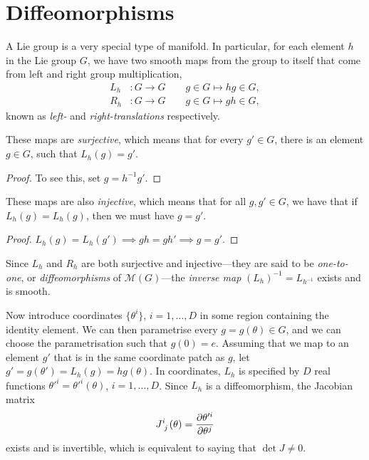 \section{Diffeomorphisms}%
\label{sec:diffeomorphisms}

A Lie group is a very special type of manifold. In particular, for each element $h$ in the Lie group $G$, we have two smooth maps from the group to itself that come from left and right group multiplication,
\begin{align}
  L_h &\colon G \to G \qquad g \in G \mapsto hg \in G, \\
  R_h &\colon G \to G \qquad g \in G \mapsto gh \in G,
\end{align}
known as \emph{left-} and \emph{right-translations} respectively.

\begin{claim}
  These maps are \emph{surjective}, which means that for every $g' \in G$, there is an element $g \in G$, such that $L_h(g) = g'$. 
\end{claim}
\begin{proof}
  To see this, set $g = h^{-1} g'$.
\end{proof}

\begin{claim}
  These maps are also \emph{injective}, which means that for all $g, g' \in G$, we have that if $L_h(g) = L_h(g)$, then we must have $g = g'$.
\end{claim}
\begin{proof}
  \(
    L_h(g) = L_h(g') \implies gh = gh' \implies g = g'.
    \)
\end{proof}
\begin{definition}[]
  Since $L_h$ and $R_h$ are both surjective and injective---they are said to be \emph{one-to-one}, or \emph{diffeomorphisms} of $\mathcal{M}(G)$---the \emph{inverse map} $(L_h)^{-1} = L_{h^{-1}}$ exists and is smooth.
\end{definition}

\begin{wrapfigure}{L}{0.37\columnwidth}
  \centering
  \def\svgwidth{0.3\columnwidth}
  
  \label{fig:l8f1}
\end{wrapfigure}

Now introduce coordinates $\{ \theta^i \}$, $i = 1, \dots, D$ in some region containing the identity element. We can then parametrise every $g = g(\theta) \in G$, and we can choose the parametrisation such that $g(0) = e$.
Assuming that we map to an element $g'$ that is in the same coordinate patch as $g$, let $g' = g(\theta') = L_h(g) = h g(\theta)$.
In coordinates, $L_h$ is specified by $D$ real functions $\theta'^i = \theta'^i(\theta)$, $i = 1, \dots, D$.
Since $L_h$ is a diffeomorphism, the Jacobian matrix
\begin{equation}
  J \indices{^i_j}(\theta) = \pdv{\theta'^i}{\theta^j}
\end{equation}
exists and is invertible, which is equivalent to saying that $\det J \neq 0$.
